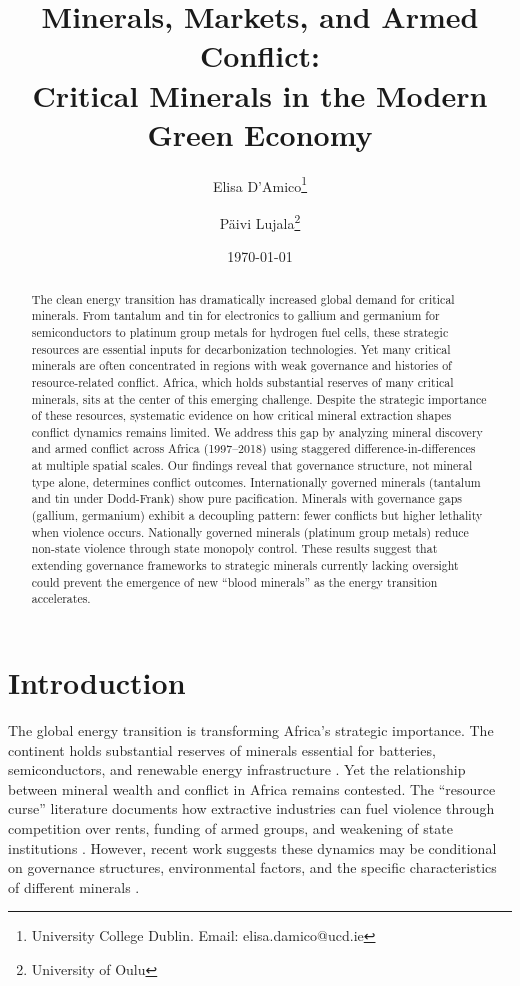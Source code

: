 \documentclass[11pt]{article}
\title{Minerals, Markets, and Armed Conflict: \\ Critical Minerals in the Modern Green Economy}
\author{Elisa D'Amico\thanks{University College Dublin. Email: elisa.damico@ucd.ie} \and P\"aivi Lujala\thanks{University of Oulu}}
\date{\today}
\begin{document}
\maketitle

\begin{abstract}
\noindent The clean energy transition has dramatically increased global demand for critical minerals. From tantalum and tin for electronics to gallium and germanium for semiconductors to platinum group metals for hydrogen fuel cells, these strategic resources are essential inputs for decarbonization technologies. Yet many critical minerals are often concentrated in regions with weak governance and histories of resource-related conflict. Africa, which holds substantial reserves of many critical minerals, sits at the center of this emerging challenge. Despite the strategic importance of these resources, systematic evidence on how critical mineral extraction shapes conflict dynamics remains limited. We address this gap by analyzing mineral discovery and armed conflict across Africa (1997--2018) using staggered difference-in-differences at multiple spatial scales. Our findings reveal that governance structure, not mineral type alone, determines conflict outcomes. Internationally governed minerals (tantalum and tin under Dodd-Frank) show pure pacification. Minerals with governance gaps (gallium, germanium) exhibit a decoupling pattern: fewer conflicts but higher lethality when violence occurs. Nationally governed minerals (platinum group metals) reduce non-state violence through state monopoly control. These results suggest that extending governance frameworks to strategic minerals currently lacking oversight could prevent the emergence of new ``blood minerals'' as the energy transition accelerates.
\end{abstract}

\section{Introduction}

The global energy transition is transforming Africa's strategic importance. The continent holds substantial reserves of minerals essential for batteries, semiconductors, and renewable energy infrastructure \citep{iea2021critical}. Yet the relationship between mineral wealth and conflict in Africa remains contested. The ``resource curse'' literature documents how extractive industries can fuel violence through competition over rents, funding of armed groups, and weakening of state institutions \citep{ross2004does, collier2004greed, lujala2005diamond, fearon2005primary}. However, recent work suggests these dynamics may be conditional on governance structures, environmental factors, and the specific characteristics of different minerals \citep{bazzi2019promises, berman2017mine, sanchez2020mining, buhaug2015climate, vonuexkull2016civil, koubi2019climate}.
\end{document}
